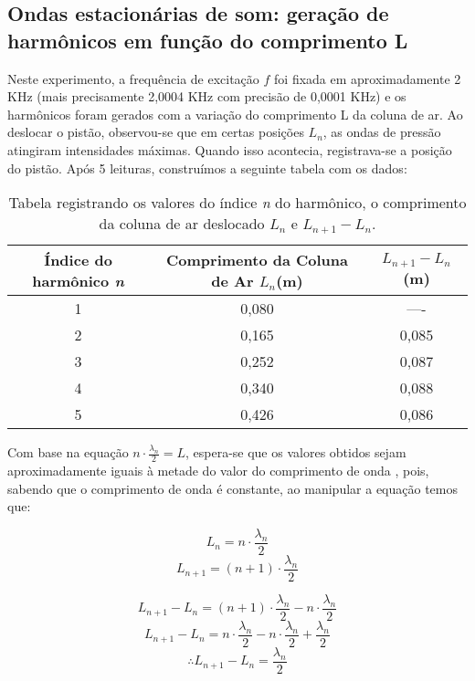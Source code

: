 \subsection{Ondas estacionárias de som: geração de harmônicos em
função do comprimento L}

Neste experimento, a frequência de excitação $f$ foi fixada em aproximadamente 2 KHz (mais precisamente 2,0004 KHz com precisão de 0,0001 KHz) e os harmônicos foram gerados com a variação do comprimento L da coluna de ar. Ao deslocar o pistão, observou-se que em certas posições $L_n$, as ondas de pressão atingiram intensidades máximas. Quando isso acontecia, registrava-se a posição do pistão. Após 5 leituras, construímos a seguinte tabela com os dados:

\begin{table}[H]
    
    \begin{tabular}{ |c||c||c|  }
        \hline
        \textbf{Índice do harmônico \textit{n}} & \textbf{Comprimento da Coluna de Ar \textit{$L_n$}(m)} & \textbf{$L_{n+1} - L_n$ (m)}\\
        \hline 
         1&	0,080&	----	\\
         
         2&	0,165&	0,085 \\
         
         3&	0,252&	0,087 \\
         
         4&	0,340&	0,088 \\
         
         5&	0,426&	0,086 \\
        \hline
    \end{tabular}
    \caption{Tabela registrando os valores do índice \textit{n} do harmônico, o comprimento da coluna de ar deslocado \textit{$L_n$} e \textit{$L_{n+1} - L_n$}.}
\end{table}

Com base na equação $n \cdot \frac{\lambda_n}{2}=L$, espera-se que os valores obtidos sejam aproximadamente iguais à metade do valor do comprimento de onda , pois, sabendo que o comprimento de onda  é constante, ao manipular a equação temos que:

\[ L_n = n \cdot \frac{\lambda_n}{2}\] 
\[L_{n+1} = (n+1) \cdot \frac{\lambda_n}{2}\]

\[L_{n+1} - L_n = (n+1) \cdot \frac{\lambda_n}{2} - n \cdot \frac{\lambda_n}{2}\] 
\[L_{n+1} - L_n = n \cdot \frac{\lambda_n}{2} - n \cdot \frac{\lambda_n}{2} + \frac{\lambda_n}{2}\] 
\[\therefore L_{n+1} - L_n = \frac{\lambda_n}{2}\] 

